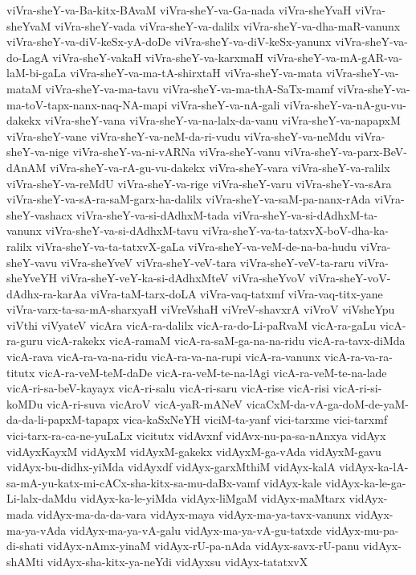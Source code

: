 {viVra-sheY-va-Ba-kitx-BAvaM
viVra-sheY-va-Ga-nada
viVra-sheYvaH
viVra-sheYvaM
viVra-sheY-vada
viVra-sheY-va-dalilx
viVra-sheY-va-dha-maR-vanunx
viVra-sheY-va-diV-keSx-yA-doDe
viVra-sheY-va-diV-keSx-yanunx
viVra-sheY-va-do-LagA
viVra-sheY-vakaH
viVra-sheY-va-karxmaH
viVra-sheY-va-mA-gAR-va-laM-bi-gaLa
viVra-sheY-va-ma-tA-shirxtaH
viVra-sheY-va-mata
viVra-sheY-va-mataM
viVra-sheY-va-ma-tavu
viVra-sheY-va-ma-thA-SaTx-mamf
viVra-sheY-va-ma-toV-tapx-nanx-naq-NA-mapi
viVra-sheY-va-nA-gali
viVra-sheY-va-nA-gu-vu-dakekx
viVra-sheY-vana
viVra-sheY-va-na-lalx-da-vanu
viVra-sheY-va-napapxM
viVra-sheY-vane
viVra-sheY-va-neM-da-ri-vudu
viVra-sheY-va-neMdu
viVra-sheY-va-nige
viVra-sheY-va-ni-vARNa
viVra-sheY-vanu
viVra-sheY-va-parx-BeV-dAnAM
viVra-sheY-va-rA-gu-vu-dakekx
viVra-sheY-vara
viVra-sheY-va-ralilx
viVra-sheY-va-reMdU
viVra-sheY-va-rige
viVra-sheY-varu
viVra-sheY-va-sAra
viVra-sheY-va-sA-ra-saM-garx-ha-dalilx
viVra-sheY-va-saM-pa-nanx-rAda
viVra-sheY-vashacx
viVra-sheY-va-si-dAdhxM-tada
viVra-sheY-va-si-dAdhxM-ta-vanunx
viVra-sheY-va-si-dAdhxM-tavu
viVra-sheY-va-ta-tatxvX-boV-dha-ka-ralilx
viVra-sheY-va-ta-tatxvX-gaLa
viVra-sheY-va-veM-de-na-ba-hudu
viVra-sheY-vavu
viVra-sheYveV
viVra-sheY-veV-tara
viVra-sheY-veV-ta-raru
viVra-sheYveYH
viVra-sheY-veY-ka-si-dAdhxMteV
viVra-sheYvoV
viVra-sheY-voV-dAdhx-ra-karAa
viVra-taM-tarx-doLA
viVra-vaq-tatxmf
viVra-vaq-titx-yane
viVra-varx-ta-sa-mA-sharxyaH
viVreVshaH
viVreV-shavxrA
viVroV
viVsheYpu
viVthi
viVyateV
vicAra
vicA-ra-dalilx
vicA-ra-do-Li-paRvaM
vicA-ra-gaLu
vicA-ra-guru
vicA-rakekx
vicA-ramaM
vicA-ra-saM-ga-na-na-ridu
vicA-ra-tavx-diMda
vicA-rava
vicA-ra-va-na-ridu
vicA-ra-va-na-rupi
vicA-ra-vanunx
vicA-ra-va-ra-titutx
vicA-ra-veM-teM-daDe
vicA-ra-veM-te-na-lAgi
vicA-ra-veM-te-na-lade
vicA-ri-sa-beV-kayayx
vicA-ri-salu
vicA-ri-saru
vicA-rise
vicA-risi
vicA-ri-si-koMDu
vicA-ri-suva
vicAroV
vicA-yaR-mANeV
vicaCxM-da-vA-ga-doM-de-yaM-da-da-li-papxM-tapapx
vica-kaSxNeYH
viciM-ta-yanf
vici-tarxme
vici-tarxmf
vici-tarx-ra-ca-ne-yuLaLx
vicitutx
vidAvxnf
vidAvx-nu-pa-sa-nAnxya
vidAyx
vidAyxKayxM
vidAyxM
vidAyxM-gakekx
vidAyxM-ga-vAda
vidAyxM-gavu
vidAyx-bu-didhx-yiMda
vidAyxdf
vidAyx-garxMthiM
vidAyx-kalA
vidAyx-ka-lA-sa-mA-yu-katx-mi-cACx-sha-kitx-sa-mu-daBx-vamf
vidAyx-kale
vidAyx-ka-le-ga-Li-lalx-daMdu
vidAyx-ka-le-yiMda
vidAyx-liMgaM
vidAyx-maMtarx
vidAyx-mada
vidAyx-ma-da-da-vara
vidAyx-maya
vidAyx-ma-ya-tavx-vanunx
vidAyx-ma-ya-vAda
vidAyx-ma-ya-vA-galu
vidAyx-ma-ya-vA-gu-tatxde
vidAyx-mu-pa-di-shati
vidAyx-nAmx-yinaM
vidAyx-rU-pa-nAda
vidAyx-savx-rU-panu
vidAyx-shAMti
vidAyx-sha-kitx-ya-neYdi
vidAyxsu
vidAyx-tatatxvX
}
